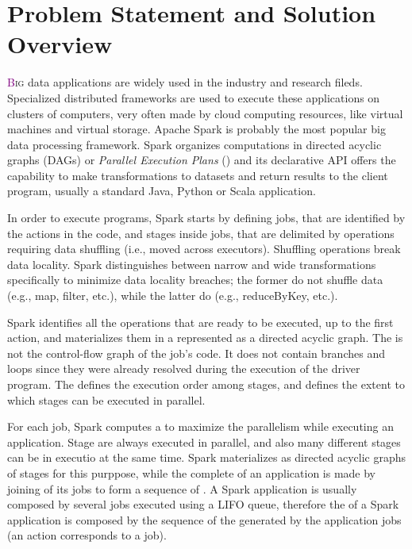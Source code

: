 \chapter{Problem Statement and Solution Overview} \label{chap:ProblemAndSolution}

\lettrine[lines=4]{\textcolor{purple}{B}}{ig} data applications are widely used in the industry and research fileds. Specialized   distributed frameworks are used to execute these applications on clusters of computers, very often made by cloud computing resources, like virtual machines and virtual storage. Apache Spark is probably the most popular big data processing framework. Spark organizes computations in directed acyclic graphs (DAGs) or  \textit{Parallel Execution Plans} (\plans) and its declarative API offers the capability to make transformations to datasets and return results to the client program, usually a standard Java, Python or Scala application. 

In order to execute programs, Spark starts by defining jobs, that are identified by the actions in the code, and stages inside jobs, that are delimited by operations requiring data shuffling (i.e., moved across executors). Shuffling operations break data locality. Spark distinguishes
between narrow and wide transformations specifically to minimize data locality breaches; the former do not shuffle data (e.g., map, filter, etc.), while the latter do (e.g., reduceByKey, etc.). 

Spark identifies all the operations that are ready to be executed, up to the first action, and
materializes them in a \plan represented as a directed acyclic graph. The \plan is not the control-flow graph of the job’s code. It does not contain branches and loops since they were already resolved during the execution of the driver program. The \plan defines the execution order among stages, and defines the extent to which stages can be executed in parallel. 

For each job, Spark computes a \plan to maximize the parallelism while executing an application. Stage are always executed in parallel, and also many different stages can be in executio at the same time. Spark materializes \plans as directed acyclic graphs of stages  for this purppose, while the complete \plan of an application is made by joining  \plans of its jobs to form a sequence of \plans. A Spark application is usually composed by several jobs executed using a LIFO queue, therefore the \plan of a Spark application is composed by the sequence of the \plans generated by the application jobs (an action corresponds to a job). 


